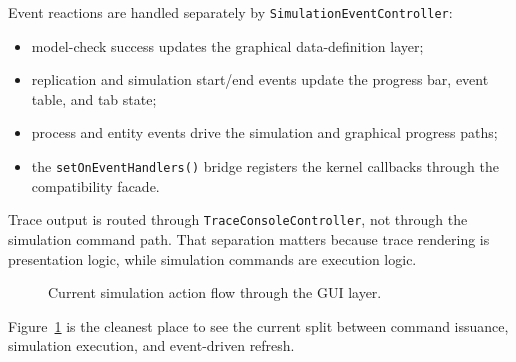 Event reactions are handled separately by \texttt{SimulationEventController}:
\begin{itemize}
\item model-check success updates the graphical data-definition layer;
\item replication and simulation start/end events update the progress bar, event table, and tab state;
\item process and entity events drive the simulation and graphical progress paths;
\item the \texttt{setOnEventHandlers()} bridge registers the kernel callbacks through the compatibility facade.
\end{itemize}

Trace output is routed through \texttt{TraceConsoleController}, not through the simulation command path. That separation matters because trace rendering is presentation logic, while simulation commands are execution logic.

\begin{figure}[htbp]
\centering
\caption{Current simulation action flow through the GUI layer.}
\label{fig:gui-architecture-simulation-flow}
\end{figure}

Figure~\ref{fig:gui-architecture-simulation-flow} is the cleanest place to see the current split between command issuance, simulation execution, and event-driven refresh.

